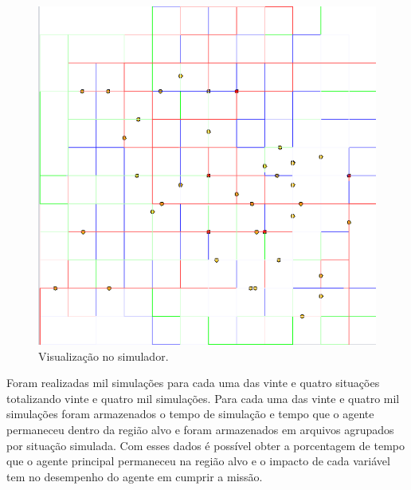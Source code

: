 \begin{figure}[htbp]
	\centering
	\includegraphics[scale=0.4]{metodologia/figuras/simulacaoGrubix.png}
	\caption{Visualização no simulador.}
	\label{fig:visulizacaoSimulador}
\end{figure}

Foram realizadas mil simulações para cada uma das vinte e quatro situações totalizando vinte e quatro mil simulações. Para cada uma das vinte e quatro mil simulações foram armazenados o tempo de simulação e tempo que o agente permaneceu dentro da região alvo e foram armazenados em arquivos agrupados por situação simulada. Com esses dados é possível obter a porcentagem de tempo que o agente principal permaneceu na região alvo e o impacto de cada variável tem no desempenho do agente em cumprir a missão.